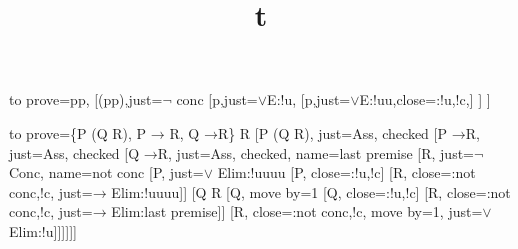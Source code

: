 \documentclass{article}
\title{t}
\newcommand*{\lif}{\ensuremath{\mathbin{\rightarrow}}}
\begin{document}
\begin{tableau}{%
  to prove=\sststile{}{}p\vee\lnot p,
}
  [\lnot(p\vee\lnot p),just=$\lnot$ conc
    [\lnot p,just=$\vee$E:!u,
      [\lnot\lnot p,just=$\vee$E:!uu,close={:!u,!c},]
    ]
  ]
\end{tableau}
\begin{tableau}
  {
    to prove={\{P \vee (Q \vee \lnot R), P \lif
      \lnot R, Q \lif \lnot R\} \sststile{}{} \lnot
    R}
  }
  [P \vee (Q \vee \lnot R), just=Ass, checked
    [P \lif \lnot R, just=Ass, checked
      [Q \lif \lnot R, just=Ass, checked, name=last premise
        [\lnot\lnot R, just={$\lnot$ Conc},
          name=not conc
          [P, just={$\vee$ Elim:!uuuu}
            [\lnot P, close={:!u,!c}]
            [\lnot R, close={:not conc,!c},
          just={$\lif$ Elim:!uuuu}]]
          [Q \vee \lnot R
            [Q, move by=1
              [\lnot Q, close={:!u,!c}]
              [\lnot R, close={:not conc,!c},
            just={$\lif$ Elim:last premise}]]
            [\lnot R, close={:not conc,!c},
  move by=1, just={$\vee$ Elim:!u}]]]]]]
\end{tableau}
\end{document}
